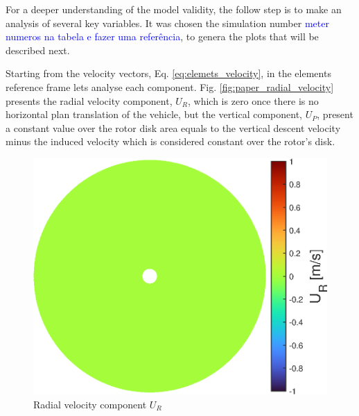{For a deeper understanding of the model validity, the follow step is to make an analysis of several key variables. It was chosen the simulation number \textcolor{blue}{meter numeros na tabela e fazer uma referência}, to genera the plots that will be described next.

Starting from the velocity vectors, Eq. \ref{eq:elemets_velocity}, in the elements reference frame lets analyse each component. Fig. \ref{fig:paper_radial_velocity} presents the radial velocity component, $U_R$, which is zero once there is no horizontal plan translation of the vehicle, but the vertical component, $U_P$, present a constant value over the rotor disk area equals to the vertical descent velocity minus the induced velocity which is considered constant over the rotor's disk. 

\begin{figure}[!htb]
    \centering
    \begin{minipage}{0.49\textwidth}
        \centering
        \includegraphics[width=\textwidth]{Figures/comp_method/sim_B/U_R.eps}
        \caption{Radial velocity component $U_R$}
        \label{fig:radial_velocity_paper}
    \end{minipage}%
    \hfill
    \begin{minipage}{0.49\textwidth}
        \centering

\end{minipage}
\end{figure}}

